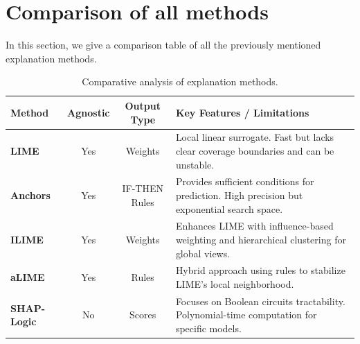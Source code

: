 
\section{Comparison of all methods}

In this section, we give a comparison table of all the previously mentioned explanation methods.

\begin{table}[ht]
    \centering
    \caption{Comparative analysis of explanation methods.}
    \label{tab:sota_comparison}
    \vspace{0.3cm}
    
    
    \small
    \begin{tabularx}{\textwidth}{@{} l c c L @{}}
        \toprule
        \textbf{Method} & \textbf{Agnostic} & \textbf{Output Type} & \textbf{Key Features / Limitations} \\
        \midrule
        
        \textbf{LIME} & Yes & Weights & 
        Local linear surrogate. Fast but lacks clear coverage boundaries and can be unstable. \\
        \addlinespace[2pt]
        
        \textbf{Anchors} & Yes & IF-THEN Rules & 
        Provides sufficient conditions for prediction. High precision but exponential search space. \\
        \addlinespace[2pt]
        
        \textbf{ILIME} & Yes & Weights & 
        Enhances LIME with influence-based weighting and hierarchical clustering for global views. \\
        \addlinespace[2pt]
        
        \textbf{aLIME} & Yes & Rules & 
        Hybrid approach using rules to stabilize LIME's local neighborhood. \\
        \addlinespace[2pt]
        
        \textbf{SHAP-Logic} & No & Scores & 
        Focuses on Boolean circuits tractability. Polynomial-time computation for specific models. \\
        
        \bottomrule
    \end{tabularx}
    
    \justifying
\end{table}